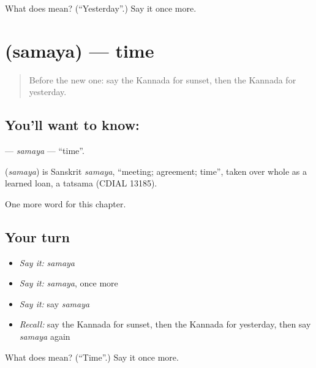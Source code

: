 \begin{tcolorbox}[breakable,colback=teal!4,colframe=teal!35!black,title={Before you move on}]
What does  mean? (\textquotedblleft{}Yesterday\textquotedblright{}.) Say it once more.
\end{tcolorbox}
\section[\texorpdfstring{\kn{ಸಮಯ} (samaya)}{ಸಮಯ (samaya)}]{ (samaya) — time}

\label{lesson:KA-C284-samaya}



\begin{quote}
Before the new one: say the Kannada for sunset, then the Kannada for yesterday.
\end{quote}

\subsection*{You'll want to know: }
\textbf{} — \emph{samaya} — \textquotedblleft{}time\textquotedblright{}.

\begin{cousinweb}
\textbf{} (\emph{samaya}) is Sanskrit \emph{samaya}, \textquotedblleft{}meeting; agreement; time\textquotedblright{}, taken over whole as a learned loan, a tatsama (CDIAL 13185).
\end{cousinweb}

\begin{grammarlens}[title={What you've built}]
One more word for this chapter.
\end{grammarlens}

\subsection*{Your turn}
\begin{itemize}
\raggedright
  \item \emph{Say it:} \emph{samaya}
  \item \emph{Say it:} \emph{samaya}, once more
  \item \emph{Say it:} say \emph{samaya}
  \item \emph{Recall:} say the Kannada for sunset, then the Kannada for yesterday, then say \emph{samaya} again
\end{itemize}

\begin{tcolorbox}[breakable,colback=teal!4,colframe=teal!35!black,title={Before you move on}]
What does  mean? (\textquotedblleft{}Time\textquotedblright{}.) Say it once more.
\end{tcolorbox}
